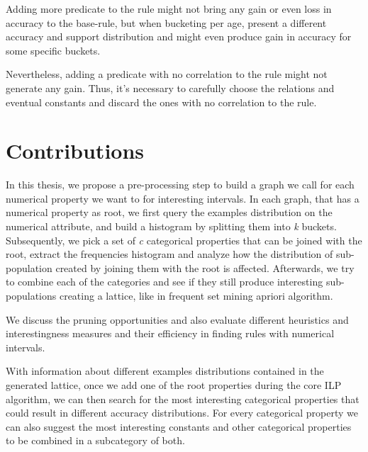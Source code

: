 Adding more predicate to the rule might not bring any gain or even loss in accuracy to the base-rule, but when bucketing
per age, present a different accuracy and support distribution and might even produce gain in accuracy for some specific
buckets.

Nevertheless, adding a predicate with no correlation to the rule might not generate any gain. Thus, it's necessary to
carefully choose the relations and eventual constants and discard the ones with no correlation to the rule.  

\section{Contributions}
In this thesis, we propose a pre-processing step to build a graph we call \graphname for each numerical property we want
to for interesting intervals. In each graph, that has a numerical property as root, we first query the examples
distribution on the numerical attribute, and build a histogram by splitting them into \emph{k} buckets. Subsequently, we
pick a set of \emph{c} categorical properties that can be joined with the root, extract the frequencies histogram and
analyze how the distribution of sub-population created by joining them with the root is affected. Afterwards, we try to
combine each of the categories and see if they still produce interesting sub-populations creating a lattice, like in
frequent set mining apriori algorithm.

We discuss the pruning opportunities and also evaluate different heuristics and interestingness measures and their
efficiency in finding rules with numerical intervals. 

\begin{comment}
In a clause containing a numerical attribute in the body, we can obtain a support and accuracy as well as support value
for each of the buckets. Therewith, we can search the most interesting intervals that satisfies the support and accuracy
thresholds
\end{comment}

With information about different examples distributions contained in the generated lattice, once we add one of the root
properties during the core ILP algorithm, we can then search for the most interesting categorical properties that could
result in different accuracy distributions. For every categorical property we can also suggest the most interesting
constants and other categorical properties to be combined in a subcategory of both.

